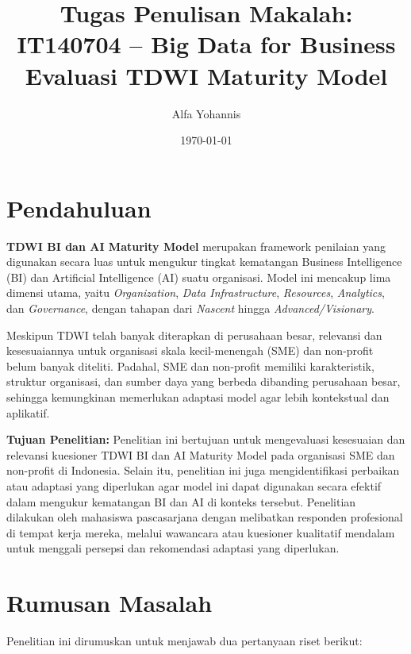 \documentclass{article}
\title{Tugas Penulisan Makalah: IT140704 -- Big Data for Business\\

\LARGE{\textbf{Evaluasi TDWI Maturity Model}}
}
\author{Alfa Yohannis}
\date{\today}
\begin{document}
	
	\maketitle
	
	\section{Pendahuluan}
	\label{sec:pendahuluan}
	
	\textbf{TDWI BI dan AI Maturity Model} merupakan framework penilaian yang digunakan secara luas untuk mengukur tingkat kematangan Business Intelligence (BI) dan Artificial Intelligence (AI) suatu organisasi. Model ini mencakup lima dimensi utama, yaitu \textit{Organization}, \textit{Data Infrastructure}, \textit{Resources}, \textit{Analytics}, dan \textit{Governance}, dengan tahapan dari \textit{Nascent} hingga \textit{Advanced/Visionary}. 
	
	Meskipun TDWI telah banyak diterapkan di perusahaan besar, relevansi dan kesesuaiannya untuk organisasi skala kecil-menengah (SME) dan non-profit belum banyak diteliti. Padahal, SME dan non-profit memiliki karakteristik, struktur organisasi, dan sumber daya yang berbeda dibanding perusahaan besar, sehingga kemungkinan memerlukan adaptasi model agar lebih kontekstual dan aplikatif.
	
	\textbf{Tujuan Penelitian:} Penelitian ini bertujuan untuk mengevaluasi kesesuaian dan relevansi kuesioner TDWI BI dan AI Maturity Model pada organisasi SME dan non-profit di Indonesia. Selain itu, penelitian ini juga mengidentifikasi perbaikan atau adaptasi yang diperlukan agar model ini dapat digunakan secara efektif dalam mengukur kematangan BI dan AI di konteks tersebut. Penelitian dilakukan oleh mahasiswa pascasarjana dengan melibatkan responden profesional di tempat kerja mereka, melalui wawancara atau kuesioner kualitatif mendalam untuk menggali persepsi dan rekomendasi adaptasi yang diperlukan.
	
	
	\section{Rumusan Masalah}
	Penelitian ini dirumuskan untuk menjawab dua pertanyaan riset berikut:
	
\end{document}
